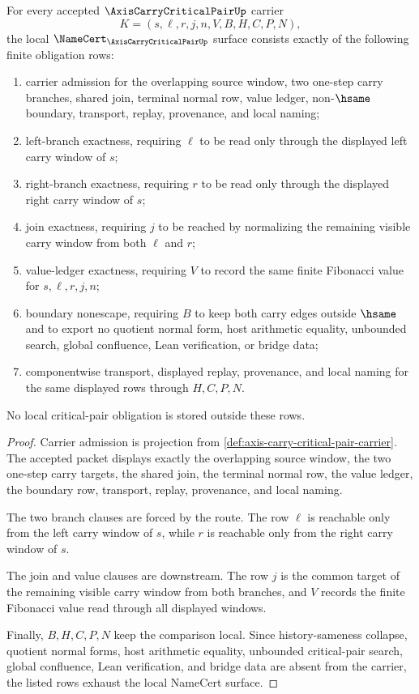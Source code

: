 \begin{theorem}
\label{thm:axis-carry-critical-pair-namecert-obligations}
For every accepted $\AxisCarryCriticalPairUp$ carrier
$$
K=(s,\ell,r,j,n,V,B,H,C,P,N),
$$
the local $\NameCert_{\AxisCarryCriticalPairUp}$ surface consists exactly of the following finite obligation rows:
\begin{enumerate}
\item carrier admission for the overlapping source window, two one-step carry branches, shared join, terminal normal row, value ledger, non-$\hsame$ boundary, transport, replay, provenance, and local naming;
\item left-branch exactness, requiring $\ell$ to be read only through the displayed left carry window of $s$;
\item right-branch exactness, requiring $r$ to be read only through the displayed right carry window of $s$;
\item join exactness, requiring $j$ to be reached by normalizing the remaining visible carry window from both $\ell$ and $r$;
\item value-ledger exactness, requiring $V$ to record the same finite Fibonacci value for $s,\ell,r,j,n$;
\item boundary nonescape, requiring $B$ to keep both carry edges outside $\hsame$ and to export no quotient normal form, host arithmetic equality, unbounded search, global confluence, Lean verification, or bridge data;
\item componentwise transport, displayed replay, provenance, and local naming for the same displayed rows through $H,C,P,N$.
\end{enumerate}
No local critical-pair obligation is stored outside these rows.
\end{theorem}
\begin{proof}
Carrier admission is projection from \autoref{def:axis-carry-critical-pair-carrier}. The accepted packet displays exactly the overlapping source window, the two one-step carry targets, the shared join, the terminal normal row, the value ledger, the boundary row, transport, replay, provenance, and local naming.

The two branch clauses are forced by the route. The row $\ell$ is reachable only from the left carry window of $s$, while $r$ is reachable only from the right carry window of $s$.

The join and value clauses are downstream. The row $j$ is the common target of the remaining visible carry window from both branches, and $V$ records the finite Fibonacci value read through all displayed windows.

Finally, $B,H,C,P,N$ keep the comparison local. Since history-sameness collapse, quotient normal forms, host arithmetic equality, unbounded critical-pair search, global confluence, Lean verification, and bridge data are absent from the carrier, the listed rows exhaust the local NameCert surface.
\end{proof}

